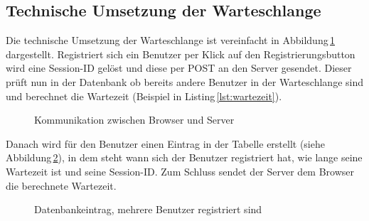 \subsection{Technische Umsetzung der Warteschlange}
Die technische Umsetzung der Warteschlange ist vereinfacht in Abbildung\,\ref{img:warteschlangeprinzip} dargestellt. Registriert sich ein Benutzer per Klick auf den Registrierungsbutton wird eine Session-ID gelöst und diese per POST an den Server gesendet. Dieser prüft nun in der Datenbank ob bereits andere Benutzer in der Warteschlange sind und berechnet die Wartezeit (Beispiel in Listing\,\ref{lst:wartezeit}).

\begin{figure}[htbp!]
	\centering
	\caption{Kommunikation zwischen Browser und Server}
	\label{img:warteschlangeprinzip}
\end{figure}

\noindent
Danach wird für den Benutzer einen Eintrag in der Tabelle erstellt (siehe Abbildung\,\ref{img:tblqueuemitBenutzer}), in dem steht wann sich der Benutzer registriert hat, wie lange seine Wartezeit ist und seine Session-ID. Zum Schluss sendet der Server dem Browser die berechnete Wartezeit.

\begin{figure}[htbp!]
	\centering
	\caption{Datenbankeintrag, mehrere Benutzer registriert sind}
	\label{img:tblqueuemitBenutzer}
\end{figure}

